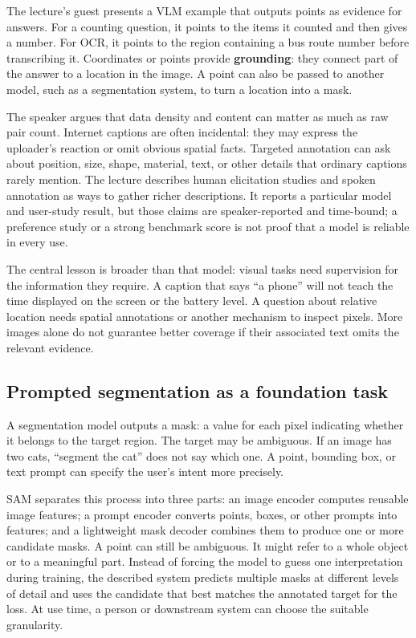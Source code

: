 The lecture's guest presents a VLM example that outputs points as evidence for answers. For a counting question, it points to the items it counted and then gives a number. For OCR, it points to the region containing a bus route number before transcribing it. Coordinates or points provide \textbf{grounding}: they connect part of the answer to a location in the image. A point can also be passed to another model, such as a segmentation system, to turn a location into a mask.

The speaker argues that data density and content can matter as much as raw pair count. Internet captions are often incidental: they may express the uploader's reaction or omit obvious spatial facts. Targeted annotation can ask about position, size, shape, material, text, or other details that ordinary captions rarely mention. The lecture describes human elicitation studies and spoken annotation as ways to gather richer descriptions. It reports a particular model and user-study result, but those claims are speaker-reported and time-bound; a preference study or a strong benchmark score is not proof that a model is reliable in every use.

The central lesson is broader than that model: visual tasks need supervision for the information they require. A caption that says ``a phone'' will not teach the time displayed on the screen or the battery level. A question about relative location needs spatial annotations or another mechanism to inspect pixels. More images alone do not guarantee better coverage if their associated text omits the relevant evidence.

\subsection{Prompted segmentation as a foundation task}\label{04-visual-computing-ii-ch031-prompted-segmentation-as-a-foundation-task}

A segmentation model outputs a mask: a value for each pixel indicating whether it belongs to the target region. The target may be ambiguous. If an image has two cats, ``segment the cat'' does not say which one. A point, bounding box, or text prompt can specify the user's intent more precisely.

SAM separates this process into three parts: an image encoder computes reusable image features; a prompt encoder converts points, boxes, or other prompts into features; and a lightweight mask decoder combines them to produce one or more candidate masks. A point can still be ambiguous. It might refer to a whole object or to a meaningful part. Instead of forcing the model to guess one interpretation during training, the described system predicts multiple masks at different levels of detail and uses the candidate that best matches the annotated target for the loss. At use time, a person or downstream system can choose the suitable granularity.

